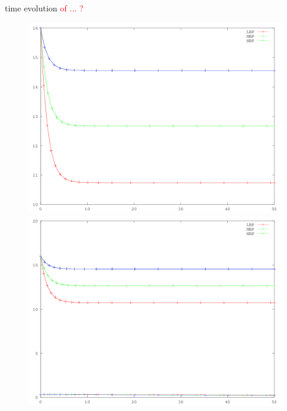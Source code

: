 \begin{frame}{time evolution \textcolor{red}{of ... ?}}
\begin{figure}[H]
\begin{minipage}{0.45\linewidth}
\includegraphics[scale=0.27]{images/IOP_time.png}
\end{minipage}\hfill
\begin{minipage}{0.45\linewidth}
\includegraphics[scale=0.27]{images/C2_time.png}
\end{minipage}
\end{figure}
\end{frame}
